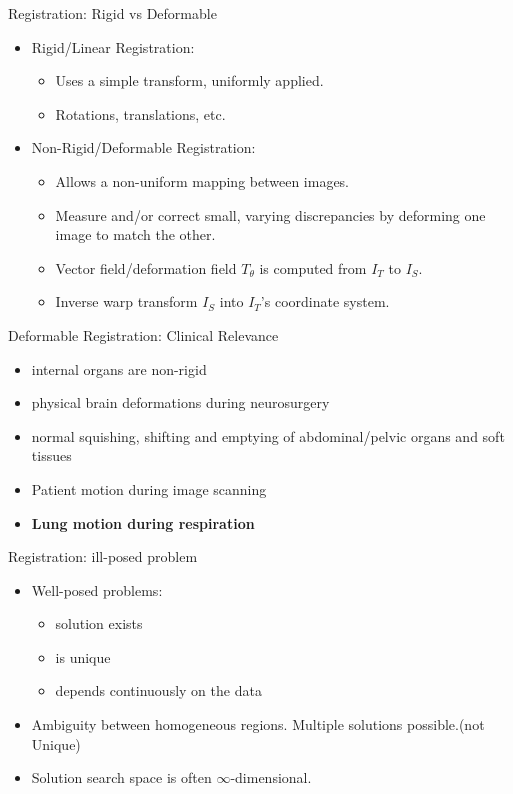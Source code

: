 \documentclass{beamer}
\begin{document}
\begin{frame}{Registration: Rigid vs Deformable}
	\begin{itemize}
  		\item Rigid/Linear Registration:
  		    \begin{itemize}
  		        \item Uses a simple transform, uniformly applied.
  		        \pause
  		        \item Rotations, translations, etc.
  		    \end{itemize}
  		\pause
  		\item Non-Rigid/Deformable Registration:
  		    \begin{itemize}
  		        \item Allows a non-uniform mapping between images.
  		        \pause
  		        \item Measure and/or correct small, varying discrepancies by deforming one image to match the other.
  		        \pause
  		        \item Vector field/deformation field $T_{\theta}$ is computed from $I_T$ to $I_S$.
  		        \item Inverse warp transform $I_S$ into $I_T$'s coordinate system.
  		    \end{itemize}
	\end{itemize}
\end{frame}

\begin{frame}{Deformable Registration: Clinical Relevance}
	\begin{itemize}
  		\item internal organs are non-rigid
  		\item physical brain deformations during neurosurgery
  		\item normal squishing, shifting and emptying of abdominal/pelvic organs and soft tissues
  		\item Patient motion during image scanning
  		\item \textbf{Lung motion during respiration}
	\end{itemize}
\end{frame}

\begin{frame}{Registration: ill-posed problem}
	\begin{itemize}
  		\item Well-posed problems:
  		\begin{itemize}
  		    \item solution exists
  		    \item is unique
  		    \item depends continuously on the data
  		\end{itemize}
  		\pause
  		\item Ambiguity between homogeneous regions. Multiple solutions possible.(not Unique)
  		\pause
  		\item Solution search space is often $\infty$-dimensional.
	\end{itemize}
\end{frame}
\end{document}
